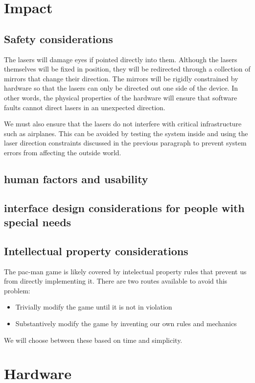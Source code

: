 \documentclass[10pt]{article}
\begin{document}
\section{Impact}
\subsection{Safety considerations}
The lasers will damage eyes if pointed directly into them.
Although the lasers themselves will be fixed in position, they will be redirected through a collection of mirrors that change their direction.
The mirrors will be rigidly constrained by hardware so that the lasers can only be directed out one side of the device.
In other words, the physical properties of the hardware will ensure that software faults cannot direct lasers in an unexpected direction.

We must also ensure that the lasers do not interfere with critical infrastructure such as airplanes.
This can be avoided by testing the system inside and using the laser direction constraints discussed in the previous paragraph to prevent system errors from affecting the outside world.
\subsection{human factors and usability}
\subsection{interface design considerations for people with special needs}
\subsection{Intellectual property considerations}
The pac-man game is likely covered by intelectual property rules that prevent us from directly implementing it.
There are two routes available to avoid this problem:
\begin{itemize}
  \item Trivially modify the game until it is not in violation
  \item Substantively modify the game by inventing our own rules and mechanics
\end{itemize}
We will choose between these based on time and simplicity.

\section{Hardware}
\end{document}
